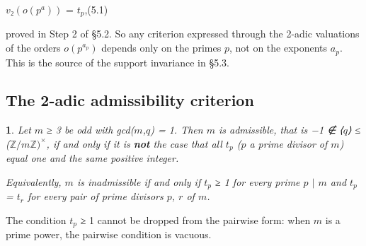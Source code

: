 \documentclass[pdflatex,sn-mathphys-num]{sn-jnl}
\theoremstyle{thmstyleone}
\newcommand{\thmxname}{}
\newtheorem*{thmxinner}{\thmxname}
\newenvironment{thmx}[1]{\renewcommand{\thmxname}{#1}\begin{thmxinner}}{\end{thmxinner}}
\theoremstyle{thmstylethree}
\begin{document}
\begin{center}\(v₂(o(p^a))\) = \(t_p\),\qquad (5.1)\end{center}

proved in Step 2 of §5.2. So any criterion expressed through the 2-adic valuations of the orders \(o(p^{a_p})\) depends only on the primes \(p\), not on the exponents \(a_p\). This is the source of the support invariance in §5.3.

\subsection{The 2-adic admissibility criterion}

\begin{thmx}{Lemma 5.1 (2-adic admissibility criterion)}

Let \(m\) ≥ 3 be odd with gcd(\(m\),\(q\)) = 1. Then \(m\) is admissible, that is −1 ∉ ⟨\(q\)⟩ ≤ (\(ℤ/mℤ)^×\), if and only if it is \textbf{not} the case that all \(t_p\) (\(p\) a prime divisor of \(m\)) equal one and the same positive integer.

Equivalently, \(m\) is inadmissible if and only if \(t_p\) ≥ 1 for every prime \(p\) \(\mid\) \(m\) and \(t_p\) = \(t_r\) for every pair of prime divisors \(p\), \(r\) of \(m\).

\end{thmx}

The condition \(t_p\) ≥ 1 cannot be dropped from the pairwise form: when \(m\) is a prime power, the pairwise condition is vacuous.
\end{document}
